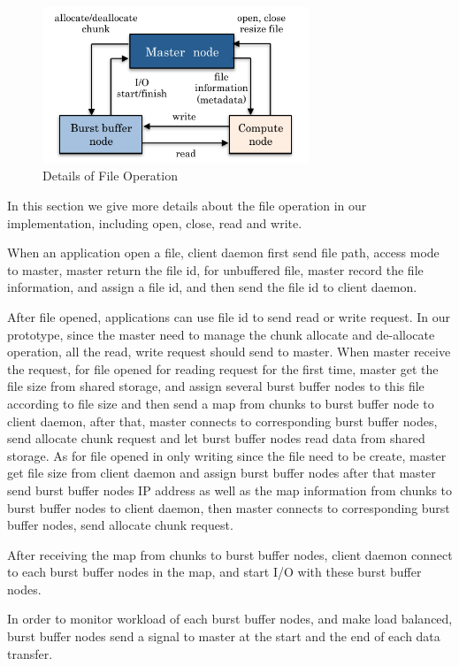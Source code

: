 \begin{figure}
\centering
\includegraphics[width=8cm]{img/file_operation-2}
\caption{Details of File Operation}
\label{implementation:file operation}
\end{figure}

In this section we give more details about the file operation in our implementation, including
open, close, read and write.

When an application open a file, client daemon first send file path, access mode to master,
master return the file id,
for unbuffered file, master record the file information, and assign a file id, and then send the
file id to client daemon.

After file opened, applications can use file id to send read or write request.
In our prototype, since the master need to manage the chunk allocate and de-allocate operation, all
the read, write request should send to master.
When master receive the request, for file opened for reading
request for the first time, master get the file size from shared storage, and assign several burst
buffer nodes to this file according to file size and then send a map from chunks to burst buffer
node to client daemon, after that, master connects to corresponding burst buffer nodes, send allocate chunk request and
let burst buffer nodes read data from shared storage.
As for file opened in only writing since the file need to be create, master get file size from
client daemon and assign burst buffer nodes after that master send burst buffer nodes IP address as well as the map
information from chunks to burst buffer nodes to client daemon, then master connects to
corresponding burst buffer nodes, send allocate chunk request.

After receiving the map from chunks to burst buffer nodes, client daemon connect to each burst
buffer nodes in the map, and start I/O with these burst buffer nodes.

In order to monitor workload of each burst buffer nodes, and make load balanced, burst buffer nodes send a signal to
master at the start and the end of each data transfer.

